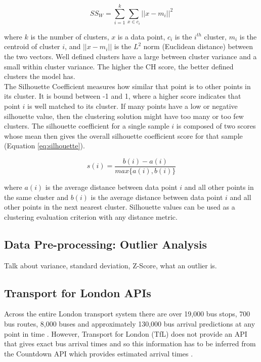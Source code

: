 \begin{equation}
    SS_W = \sum_{i=1}^k\sum_{x\in c_i} ||x-m_i|| ^ 2
    \label{eq:ssw}
\end{equation}
 
where $k$ is the number of clusters, $x$ is a data point, $c_i$ is the $i^{th}$ cluster, $m_i$ is the centroid of cluster $i$, and $||x-m_i||$ is the $L^2$ norm (Euclidean distance) between the two vectors. Well defined clusters have a large between cluster variance and a small within cluster variance. The higher the CH score, the better defined clusters the model has. \\

The Silhouette Coefficient \cite{silhouette-score} measures how similar that point is to other points in its cluster. It is bound between -1 and 1, where a higher score indicates that point $i$ is well matched to its cluster. If many points have a low or negative silhouette value, then the clustering solution might have too many or too few clusters. The silhouette coefficient for a single sample $i$ is composed of two scores whose mean then gives the overall silhouette coefficient score for that sample (Equation \ref{eq:silhouette}). 

\begin{equation}
    s(i) = \frac{b(i) - a(i)}{max\{a(i), b(i)\}}
    \label{eq:silhouette}
\end{equation}

where $a(i)$ is the average distance between data point $i$ and all other points in the same cluster and $b(i)$ is the average distance between data point $i$ and all other points in the next nearest cluster. Silhouette values can be used as a clustering evaluation criterion with any distance metric.

\subsection{Data Pre-processing: Outlier Analysis}

Talk about variance, standard deviation, Z-Score, what an outlier is.

\subsection{Transport for London APIs}
\label{section:tfl-api}

Across the entire London transport system there are over 19,000 bus stops, 700 bus routes, 8,000 buses and approximately 130,000 bus arrival predictions at any point in time \cite{tfl-bus-documentation}. However, Transport for London (TfL) does not provide an API that gives exact bus arrival times and so this information has to be inferred from the Countdown API which provides estimated arrival times \cite{tfl-api}.

